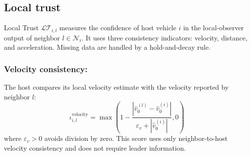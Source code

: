 \documentclass{ifacconf}
\def\N{\mathcal{N}} %
\def\LT{\mathcal{LT}} %
\begin{document}
\vspace*{-0.3cm}
\subsection{Local trust}\label{sub:local_trust}
\vspace*{-0.3cm}

Local Trust $\LT_{i,l}$ measures the confidence of host vehicle $i$ in the local-observer output of neighbor $l \in \N_i$. 
It uses three consistency indicators: velocity, distance, and acceleration. Missing data are handled by a hold-and-decay rule.




\subsubsection{Velocity consistency:}
The host compares its local velocity estimate with the velocity reported by neighbor $l$:
\begin{equation*}
    \iota_{i,l}^{\text{velocity}}
    =
    \max\left(
    1 -
    \frac{\left|\hat{v}_{0}^{(l)}-\hat{v}_{0}^{(i)}\right|}
    {\varepsilon_v+\left|\hat{v}_{0}^{(i)}\right|},
    0
    \right)
\end{equation*}
where $\varepsilon_v>0$ avoids division by zero. This score uses only neighbor-to-host velocity consistency and does not require leader information.
\end{document}
